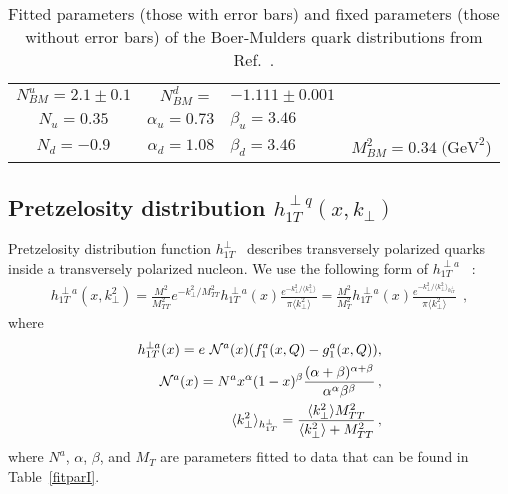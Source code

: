 \documentclass[a4paper,11pt]{article}
\newcommand{\blue}[1]{{\color{blue} #1}}
\newcommand{\ba}{\begin{eqnarray}}
\newcommand{\ea}{\end{eqnarray}}
\newcommand{\la}{\langle}
\newcommand{\ra}{\rangle}
\newcommand{\ps}[1]{\blue{#1}}
\def\kperp{k_\perp}
\def\avkperp{\la \kperp^2 \ra}
\begin{document}
\begin{table}
\centering
\begin{tabular}{crll}
\hline
$N_{BM}^u=2.1\pm0.1$ & $N_{BM}^d=$&$-1.111\pm0.001$   \\
$N_u=0.35$ & $\alpha_u=0.73$ & $\beta_u=3.46$ \\
$N_d=-0.9$ & $\alpha_d=1.08$ & $\beta_d=3.46$
& $M_{BM}^2=0.34\; \textrm{(GeV}^2$)    \\
\hline
\end{tabular}
\caption{Fitted parameters \ps{(those with error bars)}
and fixed parameters \ps{(those without error bars)}
of the Boer-Mulders quark distributions from Ref.~\cite{Barone:2009hw}.}
\label{fitparbm}
\end{table}
%

\subsection{\boldmath Pretzelosity distribution $h_{1T}^{\perp q}(x,k_\perp)$}
\label{App:basis-h1Tperp}

Pretzelosity   distribution function
$h_{1T}^{\perp}$~\cite{Lefky:2014eia} describes transversely polarized quarks
inside a transversely polarized nucleon.
We use the following form of $h_{1T}^{\perp a}$ ~\cite{Lefky:2014eia}:
\ba
h_{1T}^{\perp a}(x,k_{\perp}^2) = \frac{M^2}{M_{TT}^2} e^{-\kperp^2/M_{TT}^2} h^{\perp a}_{1T}(x) \frac{e^{-{\kperp^2}/{\avkperp}}}{\pi \avkperp}=\frac{M^2}{M_T^2} h^{\perp a}_{1T}(x) \frac{e^{-{\kperp^2}/{\avkperp_{h_{1T}^\perp}}}}{\pi \avkperp}\,\;,
\label{eq:h1Tperp}
\ea
where
\ba
h^{\perp a}_{1T}(x) = e  \ {\cal N}^a(x) (f_{1}^{a}(x, Q) - g_{1}^{a}(x, Q)), \label{eq:hx_par}\\
{\cal N}^a(x) = N^{a} x^{\alpha} (1-x)^{\beta} \frac{(\alpha + \beta)^{\alpha + \beta}}{\alpha^{\alpha} \beta^{\beta}}\, ,  \\
\avkperp_{h_{1T}^\perp}  = \frac{\avkperp M_{TT}^2}{\avkperp + M_{TT}^2}\, ,
\ea
where ${N}^a$, $\alpha$, $\beta$, and $M_T$ are parameters fitted to data that can be found in Table~\ref{fitparI}.
\end{document}
